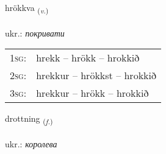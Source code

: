 \documentclass[frontgrid, backgrid]{flacards}\usepackage[]{graphicx}\usepackage[]{xcolor}
\begin{document}
\renewcommand{\flhead}{\vskip5pt \fboxsep=0pt {\small\bfseries\footnotesize Sagnorð | дієслово}}
\renewcommand{\fcfoot}{\vskip5pt \fboxsep=0pt \hspace{2pt}{\small\bfseries\footnotesize 3K}}

\renewcommand{\blhead}{\vskip5pt {\small\bfseries\footnotesize Sagnorð | дієслово }}
\renewcommand{\bcfoot}{\vskip5pt \hspace{2pt}{\small\bfseries\footnotesize 3K}}


{hrökkva \small{\textsubscript{(\textit{v.})}} \\[1ex] %
\textphonetic{[r̥œhkva]} \\
ukr.: \emph{покривати} \\  [2ex]
\renewcommand*{\arraystretch}{0.8}
\begin{tabular}{p{1cm}l}
\textsc{1sg}: & hrekk -- hrökk -- hrokkið \\ 
\textsc{2sg}: & hrekkur -- hrökkst -- hrokkið \\ 
\textsc{3sg}: & hrekkur -- hrökk -- hrokkið \\ 
\end{tabular}
}

\renewcommand{\flhead}{\vskip5pt \fboxsep=0pt {\small\bfseries\footnotesize Nafnorð | іменник}}
\renewcommand{\fcfoot}{\vskip5pt \fboxsep=0pt \hspace{2pt}{\small\bfseries\footnotesize 3K}}

\renewcommand{\blhead}{\vskip5pt {\small\bfseries\footnotesize Nafnorð | іменник }}
\renewcommand{\bcfoot}{\vskip5pt \hspace{2pt}{\small\bfseries\footnotesize 3K}}


{drottning \small{\textsubscript{(\textit{f.})}} \\[1ex] %
\textphonetic{[trɔhtniŋk]} \\
ukr.: \emph{королева} \\  [2ex]
\renewcommand*{\arraystretch}{0.8}
}
\end{document}
